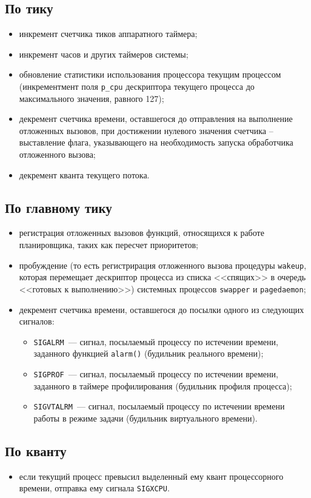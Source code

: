 
\subsection*{По тику}
\begin{itemize}
	\item инкремент счетчика тиков аппаратного таймера;
	\item инкремент часов и других таймеров системы;
	\item обновление статистики использования процессора текущим процессом (инкрементмент поля \texttt{p\_cpu} дескриптора текущего процесса до максимального значения, равного 127);
	\item декремент счетчика времени, оставшегося до отправления на выполнение отложенных вызовов, при достижении нулевого значения счетчика -- выставление флага, указывающего на необходимость запуска обработчика отложенного вызова;
	\item декремент кванта текущего потока.
\end{itemize}

\subsection*{По главному тику}
\begin{itemize}
	\item регистрация отложенных вызовов функций, относящихся к работе планировщика,
	таких как пересчет приоритетов;
	\item пробуждение (то есть регистрирация отложенного вызова процедуры \texttt{wakeup}, которая перемещает дескриптор процесса из списка <<спящих>> в очередь <<готовых к выполнению>>) системных процессов \texttt{swapper} и \texttt{pagedaemon};
	\item декремент счетчика времени, оставшегося до посылки одного из следующих сигналов:
	\begin{itemize}
		\item \texttt{SIGALRM}~--- сигнал, посылаемый процессу по истечении времени, заданного функцией \texttt{alarm()} (будильник реального времени);
		\item \texttt{SIGPROF}~--- сигнал, посылаемый процессу по истечении времени, заданного в таймере профилирования (будильник профиля процесса);
		\item \texttt{SIGVTALRM}~--- сигнал, посылаемый процессу по истечении времени работы в режиме задачи (будильник виртуального времени).
	\end{itemize}
\end{itemize}

\subsection*{По кванту}
\begin{itemize}
	\item если текущий процесс превысил выделенный ему квант процессорного времени, отправка ему сигнала \texttt{SIGXCPU}.
\end{itemize}



